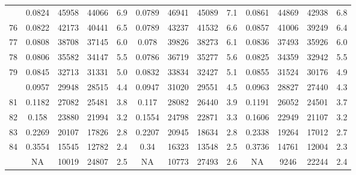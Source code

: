 \documentclass[
  14pt,
]{article}
\begin{document}
\begin{longtable}[t]{lcccccccccccc}
\addlinespace
75 & 0.0824 & 45958 & 44066 & 6.9 & 0.0789 & 46941 & 45089 & 7.1 & 0.0861 & 44869 & 42938 & 6.8\\
76 & 0.0822 & 42173 & 40441 & 6.5 & 0.0789 & 43237 & 41532 & 6.6 & 0.0857 & 41006 & 39249 & 6.4\\
77 & 0.0808 & 38708 & 37145 & 6.0 & 0.078 & 39826 & 38273 & 6.1 & 0.0836 & 37493 & 35926 & 6.0\\
78 & 0.0806 & 35582 & 34147 & 5.5 & 0.0786 & 36719 & 35277 & 5.6 & 0.0825 & 34359 & 32942 & 5.5\\
79 & 0.0845 & 32713 & 31331 & 5.0 & 0.0832 & 33834 & 32427 & 5.1 & 0.0855 & 31524 & 30176 & 4.9\\
\addlinespace
80 & 0.0957 & 29948 & 28515 & 4.4 & 0.0947 & 31020 & 29551 & 4.5 & 0.0963 & 28827 & 27440 & 4.3\\
81 & 0.1182 & 27082 & 25481 & 3.8 & 0.117 & 28082 & 26440 & 3.9 & 0.1191 & 26052 & 24501 & 3.7\\
82 & 0.158 & 23880 & 21994 & 3.2 & 0.1554 & 24798 & 22871 & 3.3 & 0.1606 & 22949 & 21107 & 3.2\\
83 & 0.2269 & 20107 & 17826 & 2.8 & 0.2207 & 20945 & 18634 & 2.8 & 0.2338 & 19264 & 17012 & 2.7\\
84 & 0.3554 & 15545 & 12782 & 2.4 & 0.34 & 16323 & 13548 & 2.5 & 0.3736 & 14761 & 12004 & 2.3\\
\addlinespace
85 & NA & 10019 & 24807 & 2.5 & NA & 10773 & 27493 & 2.6 & NA & 9246 & 22244 & 2.4\\*
\end{longtable}
\end{document}
